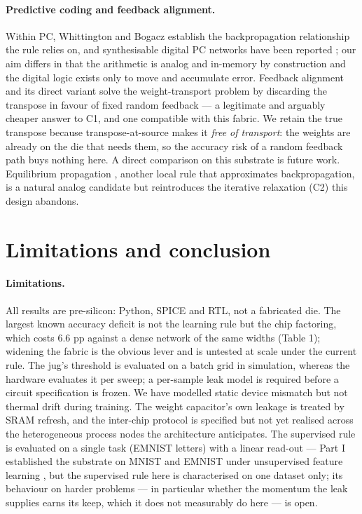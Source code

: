 \documentclass[11pt]{article}
\begin{document}
\hypertarget{predictive-coding-and-feedback-alignment.}{%
\paragraph{Predictive coding and feedback
alignment.}\label{predictive-coding-and-feedback-alignment.}}

Within PC, Whittington and Bogacz \cite{whittington2017approximation}
establish the backpropagation relationship the rule relies on, and
synthesisable digital PC networks have been reported
\cite{oh2026synthesizable}; our aim differs in that the arithmetic is
analog and in-memory by construction and the digital logic exists only
to move and accumulate error. Feedback alignment and its direct variant
\cite{lillicrap2016random, nokland2016direct} solve the
weight-transport problem by discarding the transpose in favour of fixed
random feedback --- a legitimate and arguably cheaper answer to C1, and
one compatible with this fabric. We retain the true transpose because
transpose-at-source makes it \emph{free of transport}: the weights are
already on the die that needs them, so the accuracy risk of a random
feedback path buys nothing here. A direct comparison on this substrate
is future work. Equilibrium propagation \cite{scellier2017equilibrium},
another local rule that approximates backpropagation, is a natural
analog candidate but reintroduces the iterative relaxation (C2) this
design abandons.

\hypertarget{sec:conclusion}{%
\section{Limitations and conclusion}\label{sec:conclusion}}

\hypertarget{limitations.}{%
\paragraph{Limitations.}\label{limitations.}}

All results are pre-silicon: Python, SPICE and RTL, not a fabricated
die. The largest known accuracy deficit is not the learning rule but the
chip factoring, which costs \(6.6\) pp against a dense network of the
same widths (Table 1); widening the fabric is the obvious lever and is
untested at scale under the current rule. The jug's threshold is
evaluated on a batch grid in simulation, whereas the hardware evaluates
it per sweep; a per-sample leak model is required before a circuit
specification is frozen. We have modelled static device mismatch but not
thermal drift during training. The weight capacitor's own leakage is
treated by SRAM refresh, and the inter-chip protocol is specified but
not yet realised across the heterogeneous process nodes the architecture
anticipates. The supervised rule is evaluated on a single task (EMNIST
letters) with a linear read-out --- Part I established the substrate on
MNIST and EMNIST under unsupervised feature learning
\cite{dobney2026analog}, but the supervised rule here is characterised
on one dataset only; its behaviour on harder problems --- in particular
whether the momentum the leak supplies earns its keep, which it does not
measurably do here --- is open.
\end{document}
